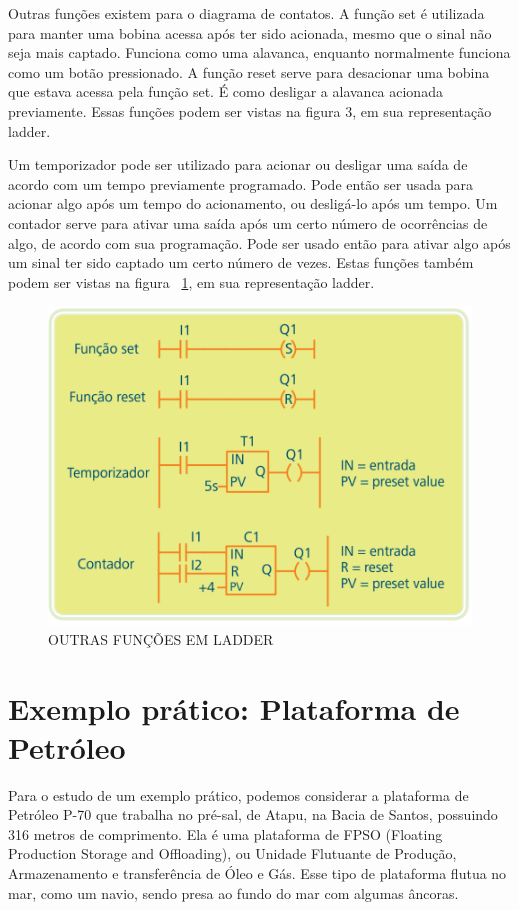 \documentclass{article}
\begin{document}
Outras funções existem para o diagrama de contatos. A função set é utilizada para manter uma bobina acessa após ter sido acionada, mesmo que o sinal não seja mais captado. Funciona como uma alavanca, enquanto normalmente funciona como um botão pressionado. A função reset serve para desacionar uma bobina que estava acessa pela função set. É como desligar a alavanca acionada previamente. Essas funções podem ser vistas na figura 3, em sua representação ladder.  

Um temporizador pode ser utilizado para acionar ou desligar uma saída de acordo com um tempo previamente programado. Pode então ser usada para acionar algo após um tempo do acionamento, ou desligá-lo após um tempo. Um contador serve para ativar uma saída após um certo número de ocorrências de algo, de acordo com sua programação. Pode ser usado então para ativar algo após um sinal ter sido captado um certo número de vezes. Estas funções também podem ser vistas na figura ~\ref{fig:funcoes}, em sua representação ladder.

\begin{figure}[h]
    \centering
    \includegraphics[width=\textwidth]{imagens/funcextras.png}
    \caption{OUTRAS FUNÇÕES EM LADDER}
    \label{fig:funcoes}
\end{figure}


\section{Exemplo prático: Plataforma de Petróleo}
Para o estudo de um exemplo prático, podemos considerar a plataforma de Petróleo P-70 que trabalha no pré-sal, de Atapu, na Bacia de Santos, possuindo 316 metros de comprimento. Ela é uma plataforma de FPSO (Floating Production Storage and Offloading), ou Unidade Flutuante de Produção, Armazenamento e transferência de Óleo e Gás. Esse tipo de plataforma flutua no mar, como um navio, sendo presa ao fundo do mar com algumas âncoras.  
\end{document}
